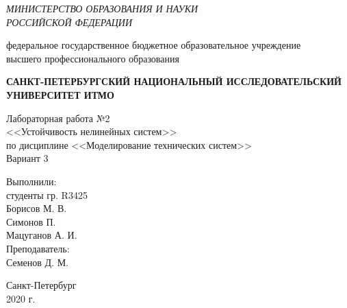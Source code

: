 \begin{titlepage}
    \begin{center}
        \textit{МИНИСТЕРСТВО ОБРАЗОВАНИЯ И НАУКИ\\
        РОССИЙСКОЙ ФЕДЕРАЦИИ}
        \vspace{1ex}

        федеральное государственное бюджетное образовательное учреждение\\
        высшего профессионального образования
        \vspace{1ex}

        \textbf{САНКТ-ПЕТЕРБУРГСКИЙ НАЦИОНАЛЬНЫЙ ИССЛЕДОВАТЕЛЬСКИЙ УНИВЕРСИТЕТ ИТМО}
        \vspace{13ex}

        Лабораторная работа №2\\
        <<Устойчивость нелинейных систем>>\\
        по дисциплине <<Моделирование технических систем>>\\
        \vspace{1em}
        Вариант 3\\
    \end{center}
    \vspace{14em}
    \begin{flushright}
        \noindent
        Выполнили:\\
        студенты гр. R3425\\
        Борисов М. В.\\
        Симонов П.\\
        Мацуганов А. И.\\
        \vspace{1em}
        Преподаватель:\\
        Семенов Д. М.
    \end{flushright}
    \vfill
    \begin{center}
        \large{Санкт-Петербург}\\
        2020 г.\\
    \end{center}
\end{titlepage}
